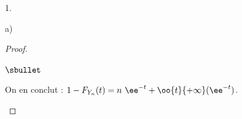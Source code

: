 \begin{noliste}{1.}
\begin{noliste}{a)}
\begin{proof}
\begin{noliste}{$\sbullet$}


        \newpage


      \item On en conclut : $1-F_{Y_n}(t) = n \ \ee^{-t} +
        \oo{t}{+\infty}(\ee^{-t})$. %
      \end{noliste}


\end{proof}
\end{noliste}
\end{noliste}
